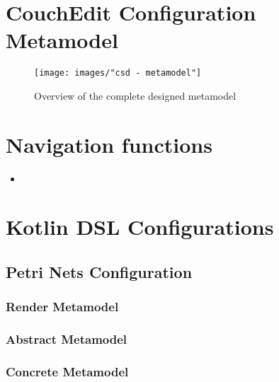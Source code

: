 \chapter{CouchEdit Configuration Metamodel}
\begin{sidewaysfigure}
\centering
\texttt{[image: images/"csd - metamodel"]}
\caption{Overview of the complete designed metamodel}
\label{fig:complete-metamodel}
\end{sidewaysfigure}

\chapter{Navigation functions}
\label{app:navigationfunctions}
\begin{itemize}
  \item {}
\end{itemize}


\chapter{Kotlin DSL Configurations}
\section{Petri Nets Configuration}
\label{app:petri}
\subsection*{Render Metamodel}

\subsection*{Abstract Metamodel}

\subsection*{Concrete Metamodel}
\raggedbottom



